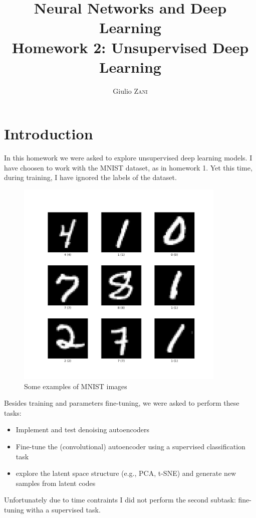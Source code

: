 \documentclass{article}
\title{Neural Networks and Deep Learning \\ Homework 2: Unsupervised Deep Learning}
\author{Giulio \textsc{Zani}} %
\begin{document}
\maketitle

\tableofcontents

\section{Introduction}
In this homework we were asked to explore unsupervised deep learning models. I have choosen to work with the MNIST dataset, as in homework 1. Yet this time, during training, I have ignored the labels of the dataset. 
\begin{figure}[H]
  \begin{center}
    \includegraphics[width=10cm]{imgs/mnist_raw_data.png}
    \caption{Some examples of MNIST images}\label{mnist_raw_data}
  \end{center}
\end{figure}

Besides training and parameters fine-tuning, we were asked to perform these tasks:
\begin{itemize}
  \item Implement and test denoising autoencoders
  \item Fine-tune the (convolutional) autoencoder using a supervised classification task
  \item explore the latent space structure (e.g., PCA, t-SNE) and generate new samples from latent codes
\end{itemize}
Unfortunately due to time contraints I did not perform the second subtask: fine-tuning witha a supervised task.
\end{document}
